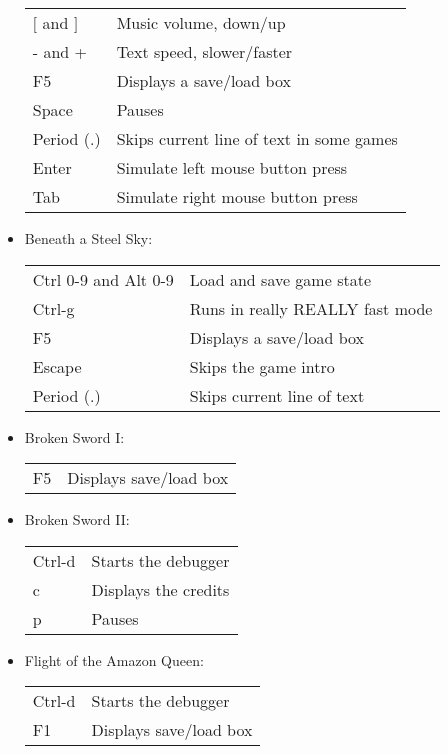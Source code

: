 \begin{itemize}
\begin{tabular}{ll}
    $[$ and $]$                & Music volume, down/up\\
    - and +                & Text speed, slower/faster\\
    F5                     & Displays a save/load box\\
    Space                  & Pauses\\
    Period (.)             & Skips current line of text in some games\\
    Enter                  & Simulate left mouse button press\\
    Tab                    & Simulate right mouse button press\\
  \end{tabular}
\item Beneath a Steel Sky:\\
  \begin{tabular}{ll}
    Ctrl 0-9 and Alt 0-9   & Load and save game state\\
    Ctrl-g                 & Runs in really REALLY fast mode\\
    F5                     & Displays a save/load box\\
    Escape                 & Skips the game intro\\
    Period (.)             & Skips current line of text\\
  \end{tabular}
\item Broken Sword I:\\
  \begin{tabular}{ll}
    F5                     & Displays save/load box\\
  \end{tabular}
\item Broken Sword II:\\
  \begin{tabular}{ll}
    Ctrl-d                 & Starts the debugger\\
    c                      & Displays the credits\\
    p                      & Pauses\\
  \end{tabular}
\item Flight of the Amazon Queen:
  \begin{tabular}{ll}
    Ctrl-d                 & Starts the debugger\\
    F1                     & Displays save/load box\\
  \end{tabular}

\end{itemize}
